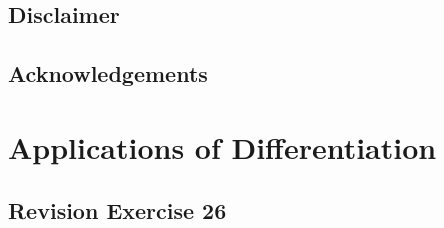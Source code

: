 \documentclass{report}
\begin{document}
\section*{Disclaimer}

\section*{Acknowledgements}

\newpage

\singlespacing{}

\doublespacing{}
\tableofcontents
\singlespacing{}
\newpage

\onehalfspacing

\titlespacing*{\chapter}{0pt}{40pt}{40pt}

\chapter{Applications of Differentiation}

\newpage
\section{Revision Exercise 26}
\end{document}
